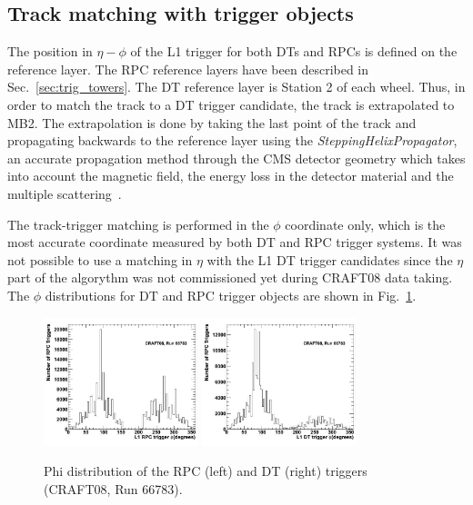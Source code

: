 \subsection{Track matching with trigger objects}
The position in $\eta - \phi$ of the L1 trigger for both DTs and RPCs is defined
on the reference layer. The RPC reference layers have been described
in Sec.~\ref{sec:trig_towers}. The DT reference layer is Station 2 
of each wheel. Thus, in order to match the track to a DT trigger candidate, 
the track is extrapolated to MB2.
The extrapolation is done by taking the last point of the track and 
propagating backwards to the reference layer using 
the {\em SteppingHelixPropagator},
an accurate propagation method through the CMS detector
geometry which takes into account the magnetic field, 
the energy loss in the detector material and the 
multiple scattering~\cite{ref:muonreco_note}.

The track-trigger matching is performed in the $\phi$ coordinate 
only, which is the most accurate coordinate measured by both 
DT and RPC trigger systems. It was not possible to use a matching
in $\eta$ with the L1 DT trigger candidates since the $\eta$ part
of the algorythm was not commissioned yet during CRAFT08 data taking. 
The $\phi$ distributions for DT and RPC trigger
objects are shown in Fig.~\ref{fig:trigger_eta_phi}.

\begin{figure}[hbtp]
  \begin{center}
    \includegraphics[width=0.4\textwidth]{phi_rpc}
    \includegraphics[width=0.4\textwidth]{phi_dt}
      \caption{Phi distribution of the RPC (left) and DT (right) triggers (CRAFT08, Run 66783).}
    \label{fig:trigger_eta_phi}
  \end{center}
\end{figure}

